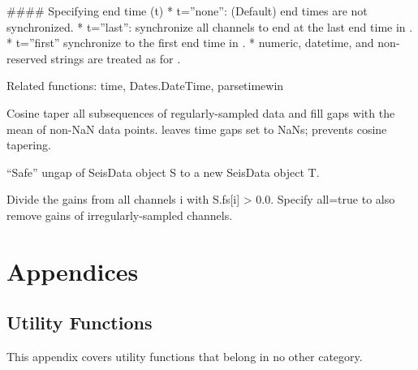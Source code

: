 \documentclass[letterpaper,11pt,english]{sphinxmanual}
\begin{document}
\#\#\#\# Specifying end time (t)
* t=”none”: (Default) end times are not synchronized.
* t=”last”: synchronize all channels to end at the last end time in .
* t=”first” synchronize to the first end time in .
* numeric, datetime, and non-reserved strings are treated as for .

Related functions: time, Dates.DateTime, parsetimewin


\begin{fulllineitems}
\end{fulllineitems}


Cosine taper all subsequences of regularly-sampled data and fill gaps with the
mean of non-NaN data points.  leaves time gaps set to NaNs;
 prevents cosine tapering.


\begin{fulllineitems}
\end{fulllineitems}


“Safe” ungap of SeisData object S to a new SeisData object T.


\begin{fulllineitems}
\end{fulllineitems}


Divide the gains from all channels i with S.fs{[}i{]} \textgreater{} 0.0. Specify all=true to
also remove gains of irregularly-sampled channels.


\chapter{Appendices}
\label{\detokenize{index:appendices}}

\section{Utility Functions}
\label{\detokenize{src/Appendices/function_list:utility-functions}}\label{\detokenize{src/Appendices/function_list:function-list}}\label{\detokenize{src/Appendices/function_list::doc}}
This appendix covers utility functions that belong in no other category.


\begin{fulllineitems}
\end{fulllineitems}
\end{document}
